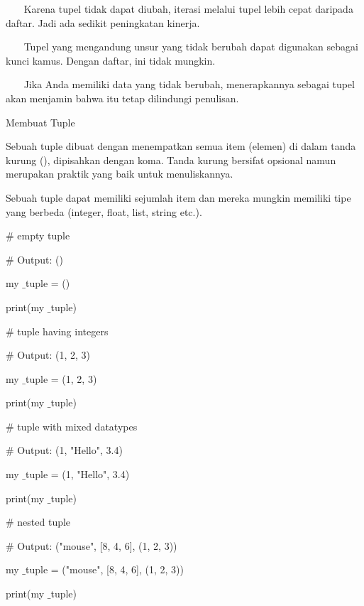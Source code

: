 ~~~ Karena tupel tidak dapat diubah, iterasi melalui tupel lebih cepat daripada daftar. Jadi ada sedikit peningkatan kinerja. \par
~~~ Tupel yang mengandung unsur yang tidak berubah dapat digunakan sebagai kunci kamus. Dengan daftar, ini tidak mungkin. \par
~~~ Jika Anda memiliki data yang tidak berubah, menerapkannya sebagai tupel akan menjamin bahwa itu tetap dilindungi penulisan. \par
\vspace{12pt}
Membuat Tuple \par
\vspace{12pt}
Sebuah tuple dibuat dengan menempatkan semua item (elemen) di dalam tanda kurung (), dipisahkan dengan koma. Tanda kurung bersifat opsional namun merupakan praktik yang baik untuk menuliskannya. \par
\vspace{12pt}
Sebuah tuple dapat memiliki sejumlah item dan mereka mungkin memiliki tipe yang berbeda (integer, float, list, string etc.). \par
\vspace{12pt}
\vspace{12pt}
 $  \#  $ empty tuple \par
 $  \#  $ Output: () \par
my $  \_  $tuple = () \par
print(my $  \_  $tuple) \par
\vspace{12pt}
 $  \#  $ tuple having integers \par
 $  \#  $ Output: (1, 2, 3) \par
my $  \_  $tuple = (1, 2, 3) \par
print(my $  \_  $tuple) \par
\vspace{12pt}
 $  \#  $ tuple with mixed datatypes \par
 $  \#  $ Output: (1, "Hello", 3.4) \par
my $  \_  $tuple = (1, "Hello", 3.4) \par
print(my $  \_  $tuple) \par
\vspace{12pt}
 $  \#  $ nested tuple \par
 $  \#  $ Output: ("mouse", [8, 4, 6], (1, 2, 3)) \par
my $  \_  $tuple = ("mouse", [8, 4, 6], (1, 2, 3)) \par
print(my $  \_  $tuple) \par
